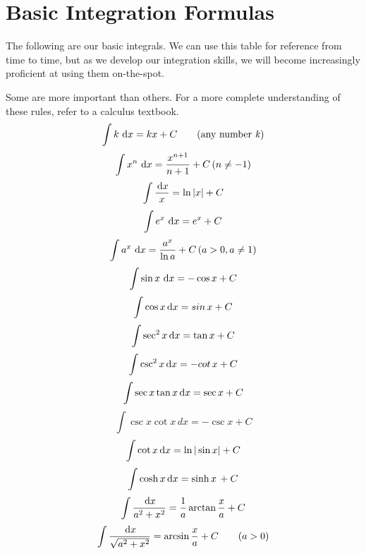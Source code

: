 \section{Basic Integration Formulas}
\label{sec:basicints}
The following are our basic integrals.
We can use this table for reference from time to time,
but as we develop our integration skills, we will become increasingly proficient at using them on-the-spot.

Some are more important than others. For a more complete understanding of these rules, refer to a calculus textbook.
\begin{equation}
  \int k\,\,\mathrm{d} x=kx+C \qquad \text{(any number \emph{k})}
\end{equation}
\begin{equation}
  \int x^n \, \,\mathrm{d} x = \frac {x^{n+1}}{n+1}+C\,(n \neq -1)
\end{equation}
\begin{equation}
  \int \frac{\,\mathrm{d} x}{x}=\ln{|x|}+C
\end{equation}
\begin{equation}
  \int e^x\, \,\mathrm{d} x=e^x+C
\end{equation}
\begin{equation}
  \int a^x\, \,\mathrm{d} x=\frac{a^x}{\ln a}+C \,(a>0,a\neq 1)
\end{equation}
\begin{equation}
  \int \sin x \, \,\mathrm{d} x=-\cos x +C
\end{equation}
\begin{equation}
  \int \cos x \,\mathrm{d} x=sin\,x+C
\end{equation}
\begin{equation}
  \int \sec^2x \,\mathrm{d} x = \tan x + C
\end{equation}
\begin{equation}
  \int \csc^2 x \,\mathrm{d} x = -cot\,x +C
\end{equation}
\begin{equation}
  \int \sec x \tan x \,\mathrm{d} x = \sec x +C
\end{equation}
\begin{equation}
  \int \csc x \cot x \,dx = -\csc x +C
\end{equation}
\begin{equation}
  \int \cot x \,\mathrm{d} x=\ln{|\sin x|}+C
\end{equation}
\begin{equation}
  \int \cosh x \,\mathrm{d} x=\sinh x\,+C
\end{equation}
\begin{equation}
  \int \frac{\,\mathrm{d} x}{a^2+x^2}=\frac{1}{a}\arctan{\frac{x}{a}}+C
\end{equation}
\begin{equation}
  \int \frac{\,\mathrm{d} x}{\sqrt{a^2+x^2}}=\arcsin{\frac{x}{a}+C} \qquad (a > 0)
\end{equation}

